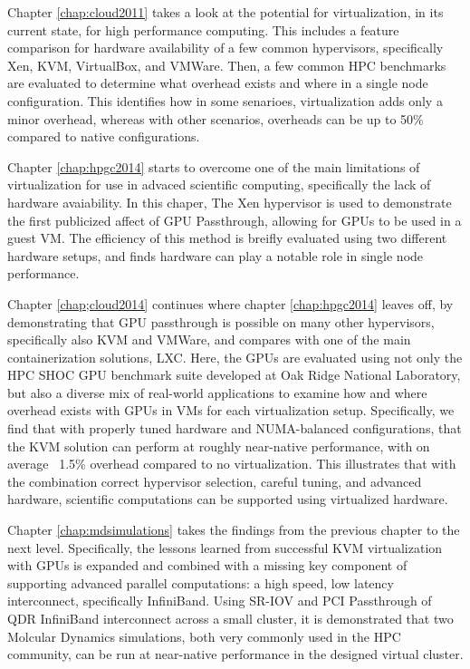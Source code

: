Chapter \ref{chap:cloud2011} takes a look at the potential for virtualization, in its current state, for high performance computing. This includes a feature comparison for hardware availability of a few common hypervisors, specifically Xen, KVM, VirtualBox, and VMWare. Then, a few common HPC benchmarks are evaluated to determine what overhead exists and where in a single node configuration. This identifies how in some senarioes, virtualization adds only a minor overhead, whereas with other scenarios, overheads can be up to 50\% compared to native configurations. 

Chapter \ref{chap:hpgc2014} starts to overcome one of the main limitations of virtualization for use in advaced scientific computing, specifically the lack of hardware avaiability. In this chaper, The Xen hypervisor is used to demonstrate the first publicized affect of GPU Passthrough, allowing for GPUs to be used in a guest VM. The efficiency of this method is breifly evaluated using two different hardware setups, and finds hardware can play a notable role in single node performance. 

Chapter \ref{chap;cloud2014} continues where chapter \ref{chap:hpgc2014} leaves off, by demonstrating that GPU passthrough is possible on many other hypervisors, specifically also KVM and VMWare, and compares with one of the main containerization solutions, LXC. Here, the GPUs are evaluated using not only the HPC SHOC GPU benchmark suite developed at Oak Ridge National Laboratory, but also a diverse mix of real-world applications to examine how and where overhead exists with GPUs in VMs for each virtualization setup.  Specifically, we find that with properly tuned hardware and NUMA-balanced configurations, that the KVM solution can perform at roughly near-native performance, with on average ~1.5\% overhead compared to no virtualization. This illustrates that with the combination correct hypervisor selection, careful tuning, and advanced hardware, scientific computations can be supported using virtualized hardware. 

Chapter \ref{chap:mdsimulations} takes the findings from the previous chapter to the next level. Specifically, the lessons learned from successful KVM virtualization with GPUs is expanded and combined with a missing key component of supporting advanced parallel computations: a high speed, low latency interconnect, specifically InfiniBand. Using SR-IOV and PCI Passthrough of QDR InfiniBand interconnect across a small cluster, it is demonstrated that two Molcular Dynamics simulations, both very commonly used in the HPC community, can be run at near-native performance in the designed virtual cluster.


